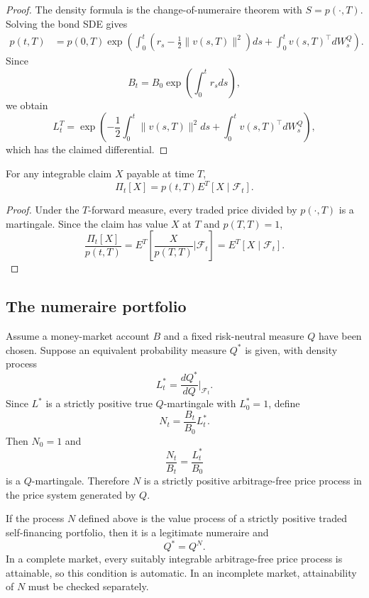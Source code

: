 \begin{proof}
The density formula is the change-of-numeraire theorem with $S=p(\cdot,T)$. Solving the bond SDE gives
\[
\begin{aligned}
p(t,T)
&=p(0,T)
 \exp\!\left(
 \int_0^t\left(r_s-\frac12\|v(s,T)\|^2\right)ds
 +\int_0^tv(s,T)^\top dW_s^Q
 \right).
\end{aligned}
\]
Since
\[
B_t=B_0\exp\!\left(\int_0^tr_sds\right),
\]
we obtain
\[
L_t^T
=\exp\!\left(
 -\frac12\int_0^t\|v(s,T)\|^2ds
 +\int_0^tv(s,T)^\top dW_s^Q
\right),
\]
which has the claimed differential.
\end{proof}

\begin{prop}
For any integrable claim $X$ payable at time $T$,
\[
\boxed{
\Pi_t[X]
=p(t,T)E^T[X\mid\mathcal{F}_t].}
\]
\end{prop}

\begin{proof}
Under the $T$-forward measure, every traded price divided by $p(\cdot,T)$ is a martingale. Since the claim has value $X$ at $T$ and $p(T,T)=1$,
\[
\frac{\Pi_t[X]}{p(t,T)}
=E^T\!\left[
 \frac{X}{p(T,T)}\bigg|\mathcal{F}_t
\right]
=E^T[X\mid\mathcal{F}_t].
\]
\end{proof}

\subsection{The numeraire portfolio}

Assume a money-market account $B$ and a fixed risk-neutral measure $Q$ have been chosen. Suppose an equivalent probability measure $Q^*$ is given, with density process
\[
L_t^*
=\frac{dQ^*}{dQ}\bigg|_{\mathcal{F}_t}.
\]
Since $L^*$ is a strictly positive true $Q$-martingale with $L_0^*=1$, define
\[
N_t=\frac{B_t}{B_0}L_t^*.
\]
Then $N_0=1$ and
\[
\frac{N_t}{B_t}=\frac{L_t^*}{B_0}
\]
is a $Q$-martingale. Therefore $N$ is a strictly positive arbitrage-free price process in the price system generated by $Q$.

\begin{prop}
If the process $N$ defined above is the value process of a strictly positive traded self-financing portfolio, then it is a legitimate numeraire and
\[
Q^*=Q^N.
\]
In a complete market, every suitably integrable arbitrage-free price process is attainable, so this condition is automatic. In an incomplete market, attainability of $N$ must be checked separately.
\end{prop}

